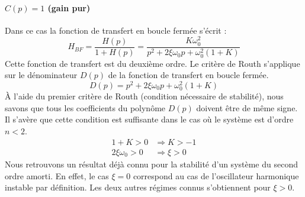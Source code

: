 \paragraph{$C(p)=1$ (gain pur)}
Dans ce cas la fonction de transfert en boucle fermée s'écrit :
\[
H_{BF}=
\dfrac{H(p)}{1+H(p)}=
\dfrac{K\omega_0^2}{p^2+2\xi\omega_0p+\omega_0^2(1+K)}
\]
Cette fonction de transfert est du deuxième ordre.
Le critère de Routh s'applique sur le dénominateur $D(p)$ de la fonction de 
transfert en boucle fermée.
\[
D(p)=p^2+2\xi\omega_0p+\omega_0^2(1+K)
\]
\`A l'aide du premier critère de Routh (condition nécessaire de stabilité), nous
savons que tous les coefficients du polynôme $D(p)$ doivent être de même signe.
Il s'avère que cette condition est suffisante dans le cas où le système est 
d'ordre $n<2$.
\begin{align*}
    1+K>0 &\Rightarrow K > -1\\
    2\xi\omega_0 > 0 &\Rightarrow \xi> 0
\end{align*}
Nous retrouvons un résultat déjà connu pour la stabilité d'un système du 
second ordre amorti. En effet, le cas $\xi=0$ correspond au cas de l'oscillateur
harmonique instable par définition. Les deux autres régimes connus s'obtiennent 
pour $\xi>0$.
